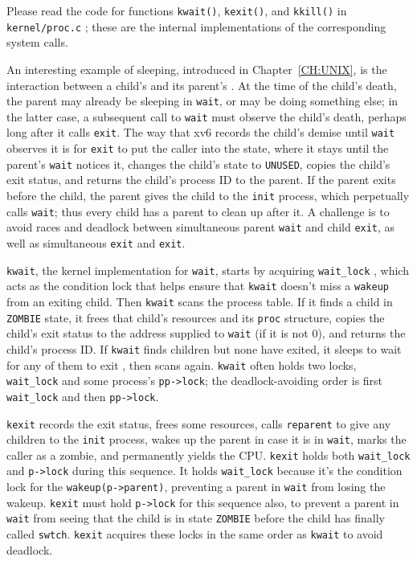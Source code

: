 Please read the code for functions {\tt kwait()}, {\tt kexit()},
and {\tt kkill()} in \lstinline{kernel/proc.c} ; these are the
internal implementations of the corresponding system calls.

An interesting example of sleeping, introduced in Chapter~\ref{CH:UNIX},
is the interaction between a child's 
and its parent's .
At the time of the child's death, the parent may already
be sleeping in {\tt wait}, or may be doing something else;
in the latter case, a subsequent call to {\tt wait} must
observe the child's death, perhaps long after it calls {\tt exit}.
The way that xv6 records the child's demise until {\tt wait}
observes it is for {\tt exit} to put the caller into the 
state, where it stays until the parent's {\tt wait} notices it, changes
the child's state to {\tt UNUSED}, copies the child's exit status,
and returns the child's process ID to the parent.
If the parent exits before the child, the 
parent gives the child to the
\lstinline{init}
process, which perpetually calls {\tt wait};
thus
every child has a parent to clean up after it.
A challenge is
to avoid races and deadlock between
simultaneous parent 
\lstinline{wait}
and child
\lstinline{exit},
as well as simultaneous
\lstinline{exit} and \lstinline{exit}.

\lstinline{kwait}, the kernel implementation
for {\tt wait}, starts by acquiring
\lstinline{wait_lock}
,
which acts as the condition
lock that helps ensure that \lstinline{kwait} doesn't miss a \lstinline{wakeup}
from an exiting child.
Then \lstinline{kwait} scans the process table.
If it finds a child in \texttt{ZOMBIE} state,
it frees that child's resources and
its \lstinline{proc} structure, copies
the child's exit status to the address supplied to \lstinline{wait}
(if it is not 0),
and returns the child's process ID.
If 
\lstinline{kwait}
finds children but none have exited,
it sleeps
to wait for any of them to exit
,
then scans again.
\lstinline{kwait} often holds two locks,
\lstinline{wait_lock} and some process's \lstinline{pp->lock};
the deadlock-avoiding order is first \lstinline{wait_lock}
and then \lstinline{pp->lock}.

\lstinline{kexit}  records the exit
status, frees some resources, calls \lstinline{reparent} to give any
children to the \lstinline{init} process, wakes up the parent in case
it is in \lstinline{wait}, marks the caller as a zombie, and
permanently yields the CPU. \lstinline{kexit} holds both
\lstinline{wait_lock} and \lstinline{p->lock} during this
sequence.
It holds \lstinline{wait_lock} because 
it's the condition
lock for the \lstinline{wakeup(p->parent)}, preventing a parent in
\lstinline{wait} from losing the wakeup. \lstinline{kexit} must hold
\lstinline{p->lock} for this sequence also, to prevent a parent in
\lstinline{wait} from seeing that the child is in state
\lstinline{ZOMBIE} before the child has finally called
\lstinline{swtch}. \lstinline{kexit} acquires these locks in
the same order as \lstinline{kwait} to avoid deadlock.

